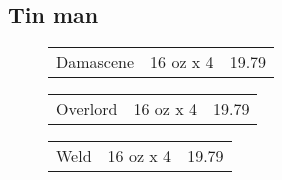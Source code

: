 \documentclass{article}%
\begin{document}
\begin{multicols}{3}
%
\subsection*{Tin man}%
\begin{description}%
\item[]%
\begin{tabular}{l c r}%
Damascene&16 oz x 4&19.79\\%
\end{tabular}%
\item[]%
\begin{tabular}{l c r}%
Overlord&16 oz x 4&19.79\\%
\end{tabular}%
\item[]%
\begin{tabular}{l c r}%
Weld&16 oz x 4&19.79\\%
\end{tabular}%
\end{description}

%
\end{multicols}%
\end{document}
